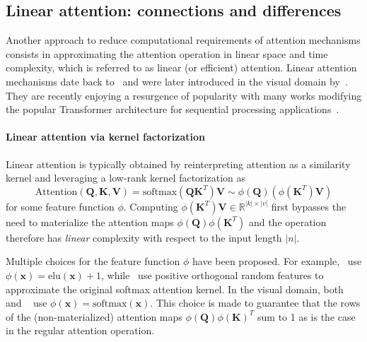 \documentclass{article} \usepackage{iclr2021_conference,times}
\begin{document}
\subsection{Linear attention: connections and differences~\label{sec:linear_attention}}
Another approach to reduce computational requirements of attention mechanisms consists in approximating the attention operation in linear space and time complexity, which is referred to as linear (or efficient) attention.
Linear attention mechanisms date back to~\cite{debrebisson2016cheap,britz2017efficient} and were later introduced in the visual domain by~\cite{chen2018double,shen2018efficient}.
They are recently enjoying a resurgence of popularity with many works modifying the popular Transformer architecture for sequential processing applications~\citep{katharopoulos2020transformers,wang2020linformer,choromanski2020rethinking}.

\vspace{-0.1cm}
\paragraph{Linear attention via kernel factorization}
Linear attention is typically obtained by reinterpreting attention as a similarity kernel and leveraging a low-rank kernel factorization as
\begin{equation}
    \label{eq:kernel_attention}
    \textrm{Attention}(\boldsymbol{Q},\boldsymbol{K},\boldsymbol{V}) =  \textrm{softmax}(\boldsymbol{Q}\boldsymbol{K}^T)\boldsymbol{V} \sim \phi(\boldsymbol{Q})(\phi(\boldsymbol{K}^T)\boldsymbol{V})
\end{equation}
for some feature function $\phi$.
Computing $\phi(\boldsymbol{K}^T)\boldsymbol{V} \in \mathbb{R}^{|k|\times|v|}$ first bypasses the need to materialize the attention maps $\phi(\boldsymbol{Q})\phi(\boldsymbol{K}^T)$ and the operation therefore has \emph{linear} complexity with respect to the input length $|n|$.

Multiple choices for the feature function $\phi$ have been proposed.
For example,~\cite{katharopoulos2020transformers} use $\phi(\boldsymbol{x}) = \textrm{elu}(\boldsymbol{x}) + 1$, while~\cite{choromanski2020rethinking} use positive orthogonal random features to approximate the original softmax attention kernel.
In the visual domain, both~\cite{chen2018double} and ~\cite{shen2018efficient} use $\phi(\boldsymbol{x}) = \textrm{softmax}(\boldsymbol{x})$.
This choice is made to guarantee that the rows of the (non-materialized) attention maps $\phi(\boldsymbol{Q})\phi(\boldsymbol{K})^T$ sum to 1 as is the case in the regular attention operation.
\end{document}
